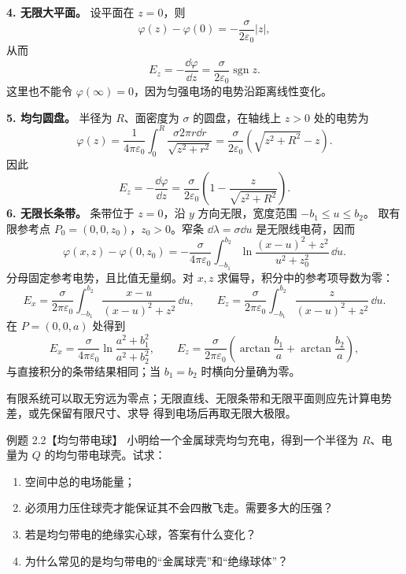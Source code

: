 \begin{xesolution}
\textbf{4. 无限大平面。} 设平面在 $z=0$，则
\[
  \boxed{\varphi(z)-\varphi(0)=-\frac{\sigma}{2\varepsilon_0}|z|},
\]
从而
\[
  \boxed{E_z=-\frac{\dd\varphi}{\dd z}
  =\frac{\sigma}{2\varepsilon_0}\operatorname{sgn}z}.
\]
这里也不能令 $\varphi(\infty)=0$，因为匀强电场的电势沿距离线性变化。

\textbf{5. 均匀圆盘。} 半径为 $R$、面密度为 $\sigma$ 的圆盘，在轴线上 $z>0$ 处的电势为
\[
  \varphi(z)=\frac{1}{4\pi\varepsilon_0}
  \int_0^R\frac{\sigma2\pi r\dd r}{\sqrt{z^2+r^2}}
  =\frac{\sigma}{2\varepsilon_0}
  \left(\sqrt{z^2+R^2}-z\right).
\]
因此
\[
  \boxed{E_z=-\frac{\dd\varphi}{\dd z}
  =\frac{\sigma}{2\varepsilon_0}
  \left(1-\frac{z}{\sqrt{z^2+R^2}}\right)}.
\]
\textbf{6. 无限长条带。} 条带位于 $z=0$，沿 $y$ 方向无限，宽度范围 $-b_1\le u\le b_2$。
取有限参考点 $P_0=(0,0,z_0)$，$z_0>0$。窄条 $\dd\lambda=\sigma\dd u$ 是无限线电荷，因而
\[
 \varphi(x,z)-\varphi(0,z_0)
 =-\frac{\sigma}{4\pi\varepsilon_0}\int_{-b_1}^{b_2}
 \ln\frac{(x-u)^2+z^2}{u^2+z_0^2}\,\dd u.
\]
分母固定参考电势，且比值无量纲。对 $x,z$ 求偏导，积分中的参考项导数为零：
\[
 E_x=\frac{\sigma}{2\pi\varepsilon_0}\int_{-b_1}^{b_2}
 \frac{x-u}{(x-u)^2+z^2}\,\dd u,\qquad
 E_z=\frac{\sigma}{2\pi\varepsilon_0}\int_{-b_1}^{b_2}
 \frac{z}{(x-u)^2+z^2}\,\dd u.
\]
在 $P=(0,0,a)$ 处得到
\[
 E_x=\frac{\sigma}{4\pi\varepsilon_0}\ln\frac{a^2+b_1^2}{a^2+b_2^2},\qquad
 E_z=\frac{\sigma}{2\pi\varepsilon_0}\left(\arctan\frac{b_1}{a}+\arctan\frac{b_2}{a}\right),
\]
与直接积分的条带结果相同；当 $b_1=b_2$ 时横向分量确为零。

有限系统可以取无穷远为零点；无限直线、无限条带和无限平面则应先计算电势差，或先保留有限尺寸、求导
得到电场后再取无限大极限。
\end{xesolution}

\begin{origexamplebox}{例题 2.2【均匀带电球】}
小明给一个金属球壳均匀充电，得到一个半径为 $R$、电量为 $Q$ 的均匀带电球壳。试求：
\begin{enumerate}[label=\arabic*.]
  \item 空间中总的电场能量；
  \item 必须用力压住球壳才能保证其不会四散飞走。需要多大的压强？
  \item 若是均匀带电的绝缘实心球，答案有什么变化？
  \item 为什么常见的是均匀带电的“金属球壳”和“绝缘球体”？
\end{enumerate}
\end{origexamplebox}

